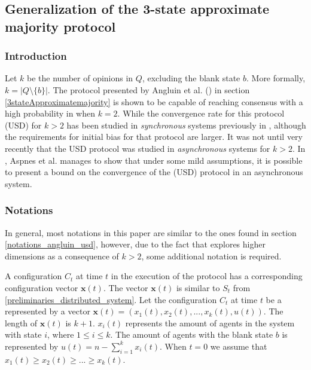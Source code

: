 \subsection{Generalization of the 3-state approximate majority protocol}

 \subsubsection{Introduction}
Let $k$ be the number of opinions in $Q$, excluding the blank state $b$. More formally, $k = |Q \setminus \{b\}|$. The protocol presented by Angluin et al. (\cite{angluinSimplePopulationProtocol2008}) in section \ref{3stateApproximatemajority} is shown to be capable of reaching consensus with a high probability in  when $k = 2$. While the convergence rate for this protocol (USD) for $k > 2$ has been studied in \emph{synchronous} systems previously in \cite{becchetti2015}, although the requirements for initial bias for that protocol are larger. It was not until very recently that the USD protocol was studied in \emph{asynchronous} systems for $k > 2$. In \cite{AspnesFastConverganceOfKOpinion2023}, Aspnes et al. manages to show that under some mild assumptions, it is possible to present a bound on the convergence of the (USD) protocol in an asynchronous system. 

\subsubsection{Notations}

In general, most notations in this paper are similar to the ones found in section \ref{notations_angluin_usd}, however, due to the fact that \cite{AspnesFastConverganceOfKOpinion2023} explores higher dimensions as a consequence of $k > 2$, some additional notation is required.

A configuration $C_t$ at time $t$ in the execution of the protocol has a corresponding configuration vector $\textbf{x}(t)$. The vector $\textbf{x}(t)$ is similar to $S_t$ from \ref{preliminaries_distributed_system}. Let the configuration $C_t$ at time $t$ be a represented by a vector $\textbf{x}(t) = (x_1(t), x_2(t), ..., x_k(t), u(t))$. The length of $\textbf{x}(t)$ is $k + 1$. $x_i(t)$ represents the amount of agents in the system with state $i$, where $1 \leq i \leq k$. The amount of agents with the blank state $b$ is represented by $u(t) = n - \sum_{i=1}^k x_i(t)$. When $t = 0$ we assume that $x_1(t) \geq x_2(t) \geq ... \geq x_k(t)$. 

